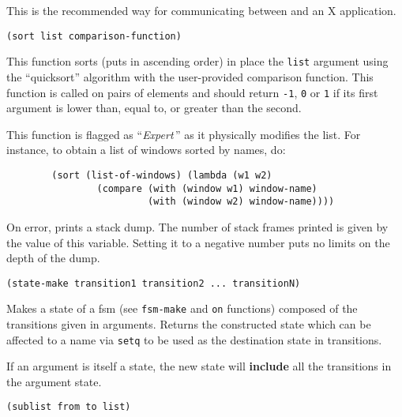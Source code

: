 This is the recommended way for communicating between {\GWM} and an X 
application.


{\usagefont\begin{verbatim}
(sort list comparison-function)
\end{verbatim}}\usageupspace

This function sorts (puts in ascending order)
in place the \verb"list" argument using the ``quicksort''
algorithm with the user-provided comparison function.
This function is called on pairs of elements and should return
\verb"-1", \verb"0" or \verb"1" if its first argument is lower than, equal
to, or greater than the second.

This function is flagged as ``{\em Expert}\,'' as it physically modifies the
list. For instance, to obtain a list of windows sorted by names, do:

{\exemplefont\begin{verbatim}
        (sort (list-of-windows) (lambda (w1 w2)
                (compare (with (window w1) window-name)
                         (with (window w2) window-name))))
\end{verbatim}}



On error, {\WOOL} prints a stack dump. The number of stack frames printed
is given by the value of this variable. Setting it to a negative number 
puts no limits on the depth of the dump.


        
{\usagefont\begin{verbatim}
(state-make transition1 transition2 ... transitionN)
\end{verbatim}}\usageupspace

Makes a state of a fsm (see \verb"fsm-make" and \verb"on" functions) 
composed of the
transitions given in arguments. Returns the constructed state which can be
affected to a name via \verb"setq" to be used as the destination state in
transitions.

If an argument is itself a state, the new state will {\bf include} all the
transitions in the argument state.

        
{\usagefont\begin{verbatim}
(sublist from to list)
\end{verbatim}}\usageupspace


